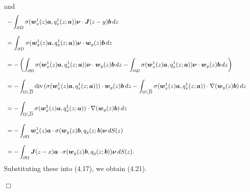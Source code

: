 and
$$\begin{array}{l}
\displaystyle
-\int_{\partial D}\sigma(\mbox{\boldmath $w$}_x^1(z)\mbox{\boldmath $a$},q_x^1(z;\mbox{\boldmath $a$}))\mbox{\boldmath $\nu$}\cdot
\mbox{\boldmath $J$}(z-y)\mbox{\boldmath $b$}\,dz
\\
\\
\displaystyle
=\int_{\partial D}\sigma(\mbox{\boldmath $w$}_x^1(z)\mbox{\boldmath $a$},q_x^1(z;\mbox{\boldmath $a$}))\mbox{\boldmath $\nu$}\cdot
\mbox{\boldmath $w$}_y(z)\mbox{\boldmath $b$}\,dz
\\
\\
\displaystyle
=-
\left(\int_{\partial\Omega}\sigma(\mbox{\boldmath $w$}_x^1(z)\mbox{\boldmath $a$},q_x^1(z;\mbox{\boldmath $a$}))\mbox{\boldmath $\nu$}\cdot
\mbox{\boldmath $w$}_y(z)\mbox{\boldmath $b$}\,dz
-\int_{\partial D}\sigma(\mbox{\boldmath $w$}_x^1(z)\mbox{\boldmath $a$},q_x^1(z;\mbox{\boldmath $a$}))\mbox{\boldmath $\nu$}\cdot
\mbox{\boldmath $w$}_y(z)\mbox{\boldmath $b$}\,dz
\right)
\\
\\
\displaystyle
=-\int_{\Omega\setminus\overline{D}}\text{div}\,(\sigma(\mbox{\boldmath $w$}_x^1(z)\mbox{\boldmath $a$},q_x^1(z;\mbox{\boldmath $a$})))
\cdot\mbox{\boldmath $w$}_y(z)\mbox{\boldmath $b$}\,dz
-\int_{\Omega\setminus\overline{D}}\sigma(\mbox{\boldmath $w$}_x^1(z)\mbox{\boldmath $a$},q_x^1(z;\mbox{\boldmath $a$}))
\cdot\nabla(\mbox{\boldmath $w$}_y(z)\mbox{\boldmath $b$})\,dz
\\
\\
\displaystyle
=-\int_{\Omega\setminus\overline{D}}\sigma(\mbox{\boldmath $w$}_x^1(z)\mbox{\boldmath $a$},q_x^1(z;\mbox{\boldmath $a$}))
\cdot\nabla(\mbox{\boldmath $w$}_y(z)\mbox{\boldmath $b$})\,dz
\\
\\
\displaystyle
=-\int_{\partial\Omega}\mbox{\boldmath $w$}_x^1(z)\mbox{\boldmath $a$}
\cdot\sigma(\mbox{\boldmath $w$}_y(z)\mbox{\boldmath $b$},q_y(z;\mbox{\boldmath $b$})
\mbox{\boldmath $\nu$}\,dS(z)
\\
\\
\displaystyle
=-\int_{\partial\Omega}\mbox{\boldmath $J$}(z-x)\mbox{\boldmath $a$}
\cdot\sigma(\mbox{\boldmath $w$}_y(z)\mbox{\boldmath $b$},q_y(z;\mbox{\boldmath $b$}))
\mbox{\boldmath $\nu$}\,dS(z).
\end{array}
$$
Substituting these into (4.17), we obtain (4.21).



\noindent
$\Box$


